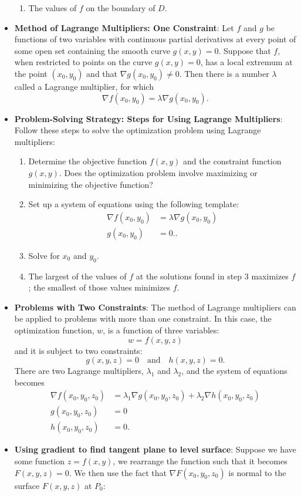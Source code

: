 \documentclass{report}
\begin{document}
\begin{itemize}
\begin{enumerate}
            \item The values of $f$ on the boundary of $D$.
        \end{enumerate}
    \item \textbf{Method of Lagrange Multipliers: One Constraint}:
        Let $f$ and $g$ be functions of two variables with continuous partial derivatives at every point of some open set containing the smooth curve $g(x,y)=0$. Suppose that $f$, when restricted to points on the curve $g(x,y)=0$, has a local extremum at the point $(x_0,y_0)$ and that $\nabla g(x_0,y_0) \neq 0$. Then there is a number $\lambda$ called a Lagrange multiplier, for which
        \[
            \nabla f(x_0,y_0) = \lambda \nabla g(x_0,y_0).
        \]
    \item \textbf{Problem-Solving Strategy: Steps for Using Lagrange Multipliers}:
        Follow these steps to solve the optimization problem using Lagrange multipliers:
        \begin{enumerate}
            \item Determine the objective function $f(x,y)$ and the constraint function $g(x,y)$. Does the optimization problem involve maximizing or minimizing the objective function?
            \item Set up a system of equations using the following template:
                \begin{align*}
                    \nabla f(x_0,y_0) &= \lambda \nabla g(x_0,y_0)  \\
                    g(x_0,y_0) &= 0.
                .\end{align*}
            \item Solve for $x_0$ and $y_0$.
            \item The largest of the values of $f$ at the solutions found in step 3 maximizes $f$; the smallest of those values minimizes $f$.
        \end{enumerate}
    \item \textbf{Problems with Two Constraints}:
        The method of Lagrange multipliers can be applied to problems with more than one constraint. In this case, the optimization function, $w$, is a function of three variables:
        \[
            w = f(x, y, z)
        \]
        and it is subject to two constraints:
        \[
            g(x, y, z) = 0 \quad \text{and} \quad h(x, y, z) = 0.
        \]
        There are two Lagrange multipliers, $\lambda_1$ and $\lambda_2$, and the system of equations becomes
        \begin{align*}
            \nabla f(x_0, y_0, z_0) &= \lambda_1 \nabla g(x_0, y_0, z_0) + \lambda_2 \nabla h(x_0, y_0, z_0) \\
            g(x_0, y_0, z_0) &= 0 \\
            h(x_0, y_0, z_0) &= 0
        .\end{align*}
    \item \textbf{Using gradient to find tangent plane to level surface}: Suppose we have some function $z = f(x,y)$, we rearrange the function such that it becomes $F(x,y,z) = 0$. We then use the fact that $\nabla F(x_{0}, y_{0}, z_{0}) $ is normal to the surface $F(x,y,z)$ at $P_{0}: $ 
    \end{itemize}
\end{document}
